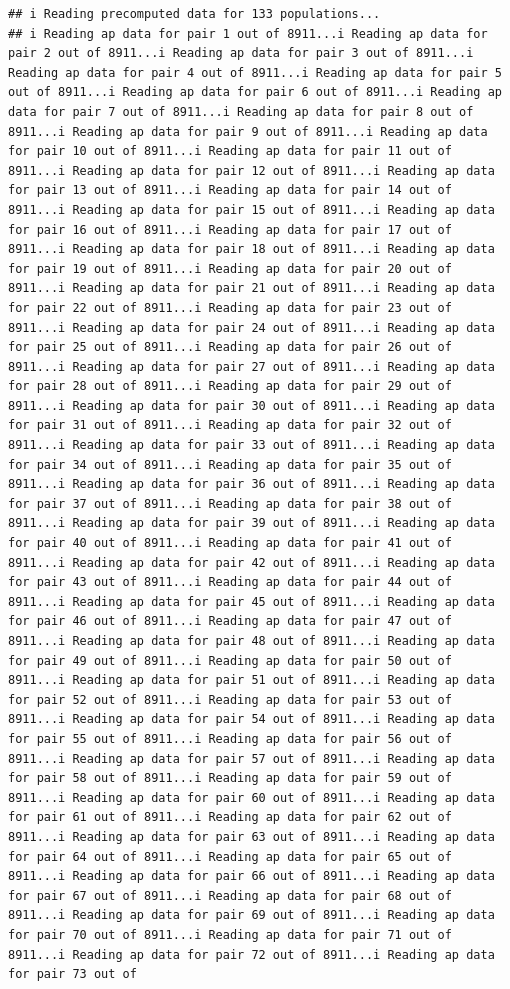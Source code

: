 \documentclass[
]{article}
\begin{document}
\begin{verbatim}
## i Reading precomputed data for 133 populations...
## i Reading ap data for pair 1 out of 8911...i Reading ap data for pair 2 out of 8911...i Reading ap data for pair 3 out of 8911...i Reading ap data for pair 4 out of 8911...i Reading ap data for pair 5 out of 8911...i Reading ap data for pair 6 out of 8911...i Reading ap data for pair 7 out of 8911...i Reading ap data for pair 8 out of 8911...i Reading ap data for pair 9 out of 8911...i Reading ap data for pair 10 out of 8911...i Reading ap data for pair 11 out of 8911...i Reading ap data for pair 12 out of 8911...i Reading ap data for pair 13 out of 8911...i Reading ap data for pair 14 out of 8911...i Reading ap data for pair 15 out of 8911...i Reading ap data for pair 16 out of 8911...i Reading ap data for pair 17 out of 8911...i Reading ap data for pair 18 out of 8911...i Reading ap data for pair 19 out of 8911...i Reading ap data for pair 20 out of 8911...i Reading ap data for pair 21 out of 8911...i Reading ap data for pair 22 out of 8911...i Reading ap data for pair 23 out of 8911...i Reading ap data for pair 24 out of 8911...i Reading ap data for pair 25 out of 8911...i Reading ap data for pair 26 out of 8911...i Reading ap data for pair 27 out of 8911...i Reading ap data for pair 28 out of 8911...i Reading ap data for pair 29 out of 8911...i Reading ap data for pair 30 out of 8911...i Reading ap data for pair 31 out of 8911...i Reading ap data for pair 32 out of 8911...i Reading ap data for pair 33 out of 8911...i Reading ap data for pair 34 out of 8911...i Reading ap data for pair 35 out of 8911...i Reading ap data for pair 36 out of 8911...i Reading ap data for pair 37 out of 8911...i Reading ap data for pair 38 out of 8911...i Reading ap data for pair 39 out of 8911...i Reading ap data for pair 40 out of 8911...i Reading ap data for pair 41 out of 8911...i Reading ap data for pair 42 out of 8911...i Reading ap data for pair 43 out of 8911...i Reading ap data for pair 44 out of 8911...i Reading ap data for pair 45 out of 8911...i Reading ap data for pair 46 out of 8911...i Reading ap data for pair 47 out of 8911...i Reading ap data for pair 48 out of 8911...i Reading ap data for pair 49 out of 8911...i Reading ap data for pair 50 out of 8911...i Reading ap data for pair 51 out of 8911...i Reading ap data for pair 52 out of 8911...i Reading ap data for pair 53 out of 8911...i Reading ap data for pair 54 out of 8911...i Reading ap data for pair 55 out of 8911...i Reading ap data for pair 56 out of 8911...i Reading ap data for pair 57 out of 8911...i Reading ap data for pair 58 out of 8911...i Reading ap data for pair 59 out of 8911...i Reading ap data for pair 60 out of 8911...i Reading ap data for pair 61 out of 8911...i Reading ap data for pair 62 out of 8911...i Reading ap data for pair 63 out of 8911...i Reading ap data for pair 64 out of 8911...i Reading ap data for pair 65 out of 8911...i Reading ap data for pair 66 out of 8911...i Reading ap data for pair 67 out of 8911...i Reading ap data for pair 68 out of 8911...i Reading ap data for pair 69 out of 8911...i Reading ap data for pair 70 out of 8911...i Reading ap data for pair 71 out of 8911...i Reading ap data for pair 72 out of 8911...i Reading ap data for pair 73 out of 
\end{verbatim}
\end{document}
